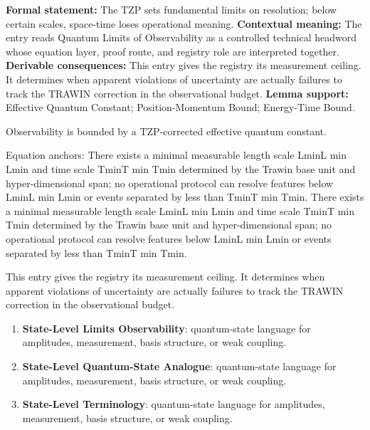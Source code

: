 \begingroup\footnotesize\setlength{\emergencystretch}{3em}\sloppy
\textbf{Formal statement:} The TZP sets fundamental limits on resolution; below certain scales, space-time loses operational meaning. \textbf{Contextual meaning:} The entry reads Quantum Limits of Observability as a controlled technical headword whose equation layer, proof route, and registry role are interpreted together. \textbf{Derivable consequences:} This entry gives the registry its measurement ceiling. It determines when apparent violations of uncertainty are actually failures to track the TRAWIN correction in the observational budget. \textbf{Lemma support:} Effective Quantum Constant; Position-Momentum Bound; Energy-Time Bound.\par
\endgroup

Observability is bounded by a TZP-corrected effective quantum constant.

Equation anchors: There exists a minimal measurable length scale LminL min Lmin and time scale TminT min Tmin determined by the Trawin base unit and hyper-dimensional span; no operational protocol can resolve features below LminL min Lmin or events separated by less than TminT min Tmin. There exists a minimal measurable length scale LminL min Lmin and time scale TminT min Tmin determined by the Trawin base unit and hyper-dimensional span; no operational protocol can resolve features below LminL min Lmin or events separated by less than TminT min Tmin.

This entry gives the registry its measurement ceiling. It determines when apparent violations of uncertainty are actually failures to track the TRAWIN correction in the observational budget.
\endgroup

\begingroup\footnotesize\sloppy
\begin{enumerate}[leftmargin=1.35em,itemsep=1pt,topsep=1pt,parsep=0pt]
\item \textbf{State-Level Limits Observability}: quantum-state language for amplitudes, measurement, basis structure, or weak coupling.
\item \textbf{State-Level Quantum-State Analogue}: quantum-state language for amplitudes, measurement, basis structure, or weak coupling.
\item \textbf{State-Level Terminology}: quantum-state language for amplitudes, measurement, basis structure, or weak coupling.
\end{enumerate}
\endgroup

